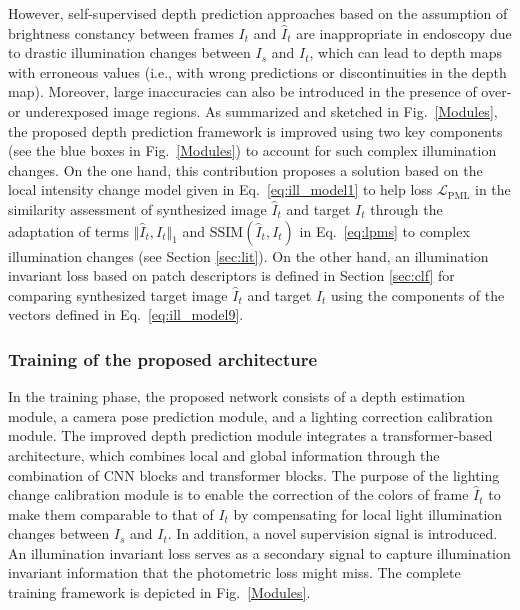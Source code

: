 \documentclass[a4paper,fleqn]{cas-dc}
\begin{document}
However, self-supervised depth prediction approaches based on the assumption of brightness constancy between frames $I_t$ and $\hat{I}_{t}$ are inappropriate in endoscopy due to drastic illumination changes between $I_s$ and $I_t$, which can lead to depth maps with erroneous values (i.e., with wrong predictions or discontinuities in the depth map). Moreover, large inaccuracies can also be introduced in the presence of over- or underexposed image regions. 
%
As summarized and sketched in Fig.~\ref{Modules}, the proposed depth prediction framework is improved using two key components (see the blue boxes in Fig.~\ref{Modules}) to account for such complex illumination changes.    
%
On the one hand, this contribution proposes a solution based on the local intensity change model given in Eq.~\eqref{eq:ill_model1} to help loss $\mathcal{L}_\textrm{PML}$ in the similarity assessment of synthesized image $\hat{I}_{t}$ and target $I_t$ through the adaptation of terms $\Vert\hat{I}_{t},I_t\Vert_1$ and $\textrm{SSIM}(\hat{I}_{t},I_t)$ in Eq.~\eqref{eq:lpms} to complex illumination changes (see Section \ref{sec:lit}). On the other hand, an illumination invariant loss based on patch descriptors is defined in Section  \ref{sec:clf} for comparing synthesized target image $\hat{I}_{t}$ and target $I_t$ using the components of the vectors defined in Eq.~\eqref{eq:ill_model9}.
%
%
\subsubsection{Training of the proposed architecture\label{sec:sst}}
%
In the training phase, the proposed network consists of a depth estimation module, a camera pose prediction module, and a lighting correction calibration module. The improved depth prediction module integrates a transformer-based architecture, which combines local and global information through the combination of CNN blocks and transformer blocks. The purpose of the lighting change calibration module is to enable the correction of the colors of frame $\hat{I}_{t}$ to make them comparable to that of $I_t$ by compensating for local light illumination changes between $I_s$ and $I_t$. 
In addition, a novel supervision signal is introduced. An illumination invariant loss serves as a secondary signal to capture illumination invariant information that the photometric loss might miss. The complete training framework is depicted in Fig.~\ref{Modules}. 
\end{document}
